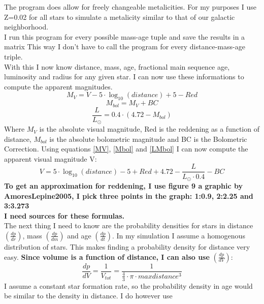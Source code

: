 \documentclass[a4paper,10pt]{article}
\begin{document}
 The program does allow for freely changeable metalicities. For my purposes I use Z=0.02 for all stars to simulate
 a metalicity similar to that of our galactic neighborhood.\\
 I run this program for every possible mass-age tuple and save the results in a matrix This way I don't have to call the program for
 every distance-mass-age triple.\\
 With this I now know distance, mass, age, fractional main sequence age, luminosity and radius for any given star. I can now use these 
 informations to compute the apparent magnitudes.
 \begin{equation}
  M_{V}=V-5\cdot\log_{10}(distance)+5-Red
  \label{MV}
 \end{equation}
 \begin{equation}
  M_{bol}=M_{V}+BC
  \label{Mbol}
 \end{equation}
 \begin{equation}
  \frac{L}{L_\odot}=0.4\cdot(4.72-M_{bol})
  \label{LMbol}
 \end{equation}
 Where $M_{V}$ is the absolute visual magnitude, Red is the reddening as a function of distance, $M_{bol}$ is the absolute bolometric 
 magnitude and BC is the Bolometric Correction. Using equations \ref{MV}, \ref{Mbol} and \ref{LMbol} I can now compute the apparent visual
 magnitude V:
 \begin{equation}
  V=5\cdot\log_{10}(distance)-5+Red+4.72-\frac{L}{L_\odot\cdot0.4}-BC
 \end{equation}
 \textbf{To get an approximation for reddening, I use figure 9 a graphic by AmoresLepine2005, I pick three points in the graph: 1:0.9, 2:2.25 and
 3:3.273}\\
 \textbf{I need sources for these formulas.}\\
 The next thing I need to know are the probability densities for stars in distance $\left(\frac{dp}{dr}\right)$, mass 
 $\left(\frac{dp}{dm}\right)$ and age $\left(\frac{dp}{dt}\right)$. In my simulation I assume a homogenous distribution of stars. 
 This makes finding a probability density for distance very easy. \textbf{Since volume is a function of distance, I can also use }
 $\left(\frac{dp}{dV}\right)$:
 \begin{equation}
  \frac{dp}{dV}=\frac{1}{V_{tot}}=\frac{1}{\frac43\cdot\pi\cdot maxdistance^3}
  \label{dpdV}
 \end{equation}
 I assume a constant star formation rate, so the probability density in age would be similar to the density in distance. I do however use
\end{document}
